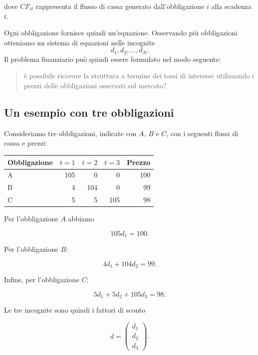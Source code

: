 dove $CF_{it}$ rappresenta il flusso di cassa generato
dall'obbligazione $i$ alla scadenza $t$.

Ogni obbligazione fornisce quindi un'equazione. Osservando più
obbligazioni otteniamo un sistema di equazioni nelle incognite
$$
    d_1,d_2,\ldots,d_N.
$$
Il problema finanziario può quindi essere formulato nel modo
seguente:
\begin{quote}
è possibile ricavare la struttura a termine dei tassi di interesse
utilizzando i prezzi delle obbligazioni osservati sul mercato?
\end{quote}


\subsection{Un esempio con tre obbligazioni}

Consideriamo tre obbligazioni, indicate con $A$, $B$ e $C$, con
i seguenti flussi di cassa e prezzi:

\begin{center}
\begin{tabular}{lrrrr}
\hline
Obbligazione & $t=1$ & $t=2$ & $t=3$ & Prezzo\\
\hline
A & 105 & 0   & 0   & 100\\
B & 4   & 104 & 0   & 99\\
C & 5   & 5   & 105 & 98\\
\hline
\end{tabular}
\end{center}

Per l'obbligazione $A$ abbiamo

\begin{equation*}
    105d_1=100.
    \label{eq:bond-A}
\end{equation*}

Per l'obbligazione $B$:

\begin{equation*}
    4d_1+104d_2=99.
    \label{eq:bond-B}
\end{equation*}

Infine, per l'obbligazione $C$:

\begin{equation*}
    5d_1+5d_2+105d_3=98.
    \label{eq:bond-C}
\end{equation*}

Le tre incognite sono quindi i fattori di sconto

\begin{equation*}
    d=
    \begin{pmatrix}
        d_1\\
        d_2\\
        d_3
    \end{pmatrix}.
\end{equation*}


